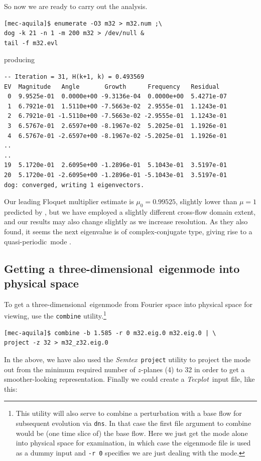 \documentclass[11pt,a4paper]{report}
\newcommand\qp{qua\-si-per\-io\-dic}
\newcommand\threed{three-di\-men\-sion\-al}
\newcommand{\Semtex}{\emph{Semtex}}
\newcommand{\Tecplot}{\emph{Tecplot}}
\begin{document}
So now we are ready to carry out the analysis.
\begin{verbatim}
[mec-aquila]$ enumerate -O3 m32 > m32.num ;\
dog -k 21 -n 1 -m 200 m32 > /dev/null &
tail -f m32.evl
\end{verbatim}
\noindent producing
{\small
\begin{verbatim}
-- Iteration = 31, H(k+1, k) = 0.493569
EV  Magnitude   Angle       Growth      Frequency   Residual
 0  9.9525e-01  0.0000e+00 -9.3136e-04  0.0000e+00  5.4271e-07
 1  6.7921e-01  1.5110e+00 -7.5663e-02  2.9555e-01  1.1243e-01
 2  6.7921e-01 -1.5110e+00 -7.5663e-02 -2.9555e-01  1.1243e-01
 3  6.5767e-01  2.6597e+00 -8.1967e-02  5.2025e-01  1.1926e-01
 4  6.5767e-01 -2.6597e+00 -8.1967e-02 -5.2025e-01  1.1926e-01
..
..
19  5.1720e-01  2.6095e+00 -1.2896e-01  5.1043e-01  3.5197e-01
20  5.1720e-01 -2.6095e+00 -1.2896e-01 -5.1043e-01  3.5197e-01
dog: converged, writing 1 eigenvectors.
\end{verbatim}
}
\noindent
Our leading Floquet multiplier estimate is $\mu_0=0.99525$, slightly
lower than $\mu=1$ predicted by \cite{bah96}, but we have employed a
slightly different cross-flow domain extent, and our results may also
change slightly as we increase resolution. As they also found, it
seems the next eigenvalue is of complex-conjugate type, giving rise to
a \qp\ mode \citep{bllo03b}.


\subsection{Getting a \threed\ eigenmode into physical space}

To get a \threed\ eigenmode from Fourier space into physical space
for viewing, use the \verb|combine| utility.\footnote{
This utility will also serve to combine a perturbation with a base
flow for subsequent evolution via \texttt{dns}.  In that case the first
file argument to combine would be (one time slice of) the base
flow. Here we just get the mode alone into physical space for
examination, in which case the eigenmode file is used as a dummy input
and \texttt{-r 0} specifies we are just dealing with the mode.}

\begin{verbatim}
[mec-aquila]$ combine -b 1.585 -r 0 m32.eig.0 m32.eig.0 | \
project -z 32 > m32_z32.eig.0
\end{verbatim}

In the above, we have also used the \Semtex\ \verb+project+ utility to
project the mode out from the minimum required number of $z$-planes
(4) to 32 in order to get a smoother-looking representation.  Finally
we could create a \Tecplot\ input file, like this:
\end{document}
